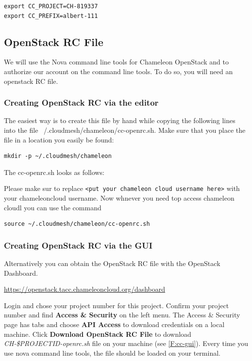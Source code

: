 \begin{lstlisting}
export CC_PROJECT=CH-819337
export CC_PREFIX=albert-111
\end{lstlisting}

\subsection{OpenStack RC File}

We will use the Nova command line tools for Chameleon OpenStack and to
authorize our account on the command line tools. To do so, you will
need an openstack RC file. 

\subsubsection{Creating OpenStack RC via the editor}

The easiest way is to create this file by hand while copying the
following lines into the file
~/.cloudmesh/chameleon/cc-openrc.sh. Make sure that you place the file
in a location you easily be found:

\begin{lstlisting}
mkdir -p ~/.cloudmesh/chameleon
\end{lstlisting}

The cc-openrc.sh looks as follows:



Please make sur to replace
\verb|<put your chameleon cloud username here>| with your
chameleoncloud username. Now whnever you need top access chameleon
cloudl you can use the command

\begin{lstlisting}
source ~/.cloudmesh/chameleon/cc-openrc.sh
\end{lstlisting}

\subsubsection{Creating OpenStack RC via the GUI}

Alternatively you can obtain the OpenStack RC file with the OpenStack
Dashboard.

\url{https://openstack.tacc.chameleoncloud.org/dashboard}

Login and chose your project number for this project.  Confirm your
project number and find \textbf{Access \& Security} on the left menu.
The Access \& Security page has tabs and choose \textbf{API Access} to
download credentials on a local machine. Click \textbf{Download
  OpenStack RC File} to download \textit{CH-\$PROJECTID-openrc.sh}
file on your machine (see \ref{F:cc-gui}). Every time you use nova
command line tools, the file should be loaded on your terminal.


